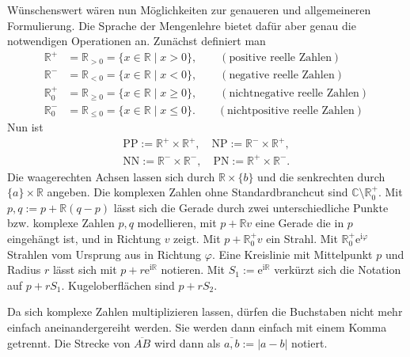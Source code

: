 \documentclass[a4paper,11pt,fleqn,twoside,BCOR=16mm]{scrartcl}
\newcommand{\R}{\mathbb R}
\newcommand{\C}{\mathbb C}
\newcommand{\ee}{\mathrm e}
\newcommand{\ui}{\mathrm i}
\begin{document}
Wünschenswert wären nun Möglichkeiten zur genaueren und allgemeineren
Formulierung. Die Sprache der Mengenlehre bietet dafür aber genau
die notwendigen Operationen an. Zunächst definiert man
\begin{align}
\R^+ &= \R_{>0} = \{x\in\R\mid x>0\},\qquad(\text{positive reelle Zahlen})\\
\R^- &= \R_{<0} = \{x\in\R\mid x<0\},\qquad(\text{negative reelle Zahlen})\\
\R_0^+ &= \R_{\ge 0} = \{x\in\R\mid x\ge 0\},\qquad(\text{nichtnegative reelle Zahlen})\\
\R_0^- &= \R_{\le 0} = \{x\in\R\mid x\le 0\}.\qquad(\text{nichtpositive reelle Zahlen})
\end{align}
Nun ist
\begin{equation}
\begin{split}
\mathrm{PP}:=\R^+\times\R^+,\quad\mathrm{NP}:=\R^-\times\R^+,\\
\mathrm{NN}:=\R^-\times\R^-,\quad\mathrm{PN}:=\R^+\times\R^-.
\end{split}
\end{equation}
Die waagerechten Achsen lassen sich durch $\R\times\{b\}$
und die senkrechten durch $\{a\}\times\R$ angeben.
Die komplexen Zahlen ohne Standardbranchcut sind
$\C\setminus\R_0^+$. Mit $p,q:=p+\R(q-p)$ lässt sich die Gerade durch
zwei unterschiedliche Punkte bzw. komplexe Zahlen $p,q$ modellieren,
mit $p+\R v$ eine Gerade die in $p$ eingehängt ist, und in
Richtung $v$ zeigt. Mit $p+\R_0^+v$ ein Strahl.
Mit $\R_0^+\ee^{\ui\varphi}$ Strahlen vom
Ursprung aus in Richtung $\varphi$. Eine Kreislinie mit Mittelpunkt
$p$ und Radius $r$ lässt sich mit $p+r\ee^{\ui\R}$ notieren.
Mit $S_1:=\ee^{\ui\R}$ verkürzt sich die Notation auf $p+rS_1$.
Kugeloberflächen sind $p+rS_2$.

Da sich komplexe Zahlen multiplizieren lassen, dürfen die
Buchstaben nicht mehr einfach aneinandergereiht werden.
Sie werden dann einfach mit einem Komma getrennt.
Die Strecke von $\overline{AB}$ wird dann als $\overline{a,b}:=|a-b|$
notiert.
\end{document}
